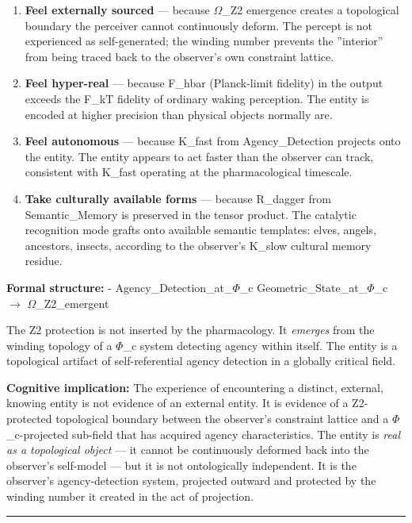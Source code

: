 \documentclass[12pt,a4paper]{article}
\begin{document}
\begin{enumerate}
    \item \textbf{Feel externally sourced} --- because $\Omega$\_Z2 emergence creates a topological boundary the perceiver cannot continuously deform. The percept is not experienced as self-generated; the winding number prevents the ''interior'' from being traced back to the observer's own constraint lattice.
    \item \textbf{Feel hyper-real} --- because F\_hbar (Planck-limit fidelity) in the output exceeds the F\_kT fidelity of ordinary waking perception. The entity is encoded at higher precision than physical objects normally are.
    \item \textbf{Feel autonomous} --- because K\_fast from Agency\_Detection projects onto the entity. The entity appears to act faster than the observer can track, consistent with K\_fast operating at the pharmacological timescale.
    \item \textbf{Take culturally available forms} --- because R\_dagger from Semantic\_Memory is preserved in the tensor product. The catalytic recognition mode grafts onto available semantic templates: elves, angels, ancestors, insects, according to the observer's K\_slow cultural memory residue.
\end{enumerate}

\textbf{Formal structure:} - Agency\_Detection\_at\_$\Phi$\_c \otimes Geometric\_State\_at\_$\Phi$\_c $\rightarrow$ $\Omega$\_Z2\_emergent

The Z2 protection is not inserted by the pharmacology. It \emph{emerges} from the winding topology of a $\Phi$\_c system detecting agency within itself. The entity is a topological artifact of self-referential agency detection in a globally critical field.

\textbf{Cognitive implication:} The experience of encountering a distinct, external, knowing entity is not evidence of an external entity. It is evidence of a Z2-protected topological boundary between the observer's constraint lattice and a $\Phi$\_c-projected sub-field that has acquired agency characteristics. The entity is \emph{real as a topological object} --- it cannot be continuously deformed back into the observer's self-model --- but it is not ontologically independent. It is the observer's agency-detection system, projected outward and protected by the winding number it created in the act of projection.

\begin{center}
\rule{0.5\textwidth}{0.4pt}
\end{center}
\end{document}
